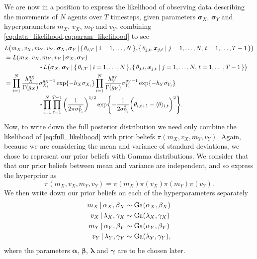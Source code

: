 We are now in a position to express the likelihood of observing data describing the movements of $N$ agents over $T$ timesteps, given parameters $\bm{\sigma}_X$, $\bm{\sigma}_Y$ and hyperparameters $m_X$, $v_X$, $m_Y$ and $v_Y$, combining \cref{eq:data_likelihood,eq:param_likelihood} to see
\begin{align}
\label{eq:full_likelihood}
\begin{split}
& 	L\big(m_X, v_X, m_Y, v_Y, \bm{\sigma}_X, \bm{\sigma}_Y  \given \{\,\theta_{i, T} \mid i=1,\ldots,N\,\},  \{\,\theta_{j, t}, \bm{x}_{j, t} \mid j= 1,\ldots, N, \, t=1,  \ldots,T-1\,\}\big) \\
	& = 	L(m_X, v_X, m_Y, v_Y \given \bm{\sigma}_X, \bm{\sigma}_Y)\\
	& \qquad\qquad\qquad \!\! \bigcdot L\big(\bm{\sigma}_X, \bm{\sigma}_Y  \given \{\,\theta_{i, T} \mid i=1,\ldots,N\,\},  \{\,\theta_{j, t}, \bm{x}_{j, t} \mid j= 1,\ldots, N, \, t=1,  \ldots,T-1\,\}\big)\\
	& = \prod_{i=1}^N \frac{h_X^{g_X}}{\Gamma(g_X)} \sigma_{X_i}^{g_X - 1} \exp{-h_X \sigma_{X_i}} \prod_{i=1}^N  \frac{h_Y^{g_Y}}{\Gamma(g_Y)} \sigma_{Y_i}^{g_Y - 1} \exp{-h_Y \sigma_{Y_i}}\\
	& \qquad\qquad\qquad \!\! \bigcdot \prod_{i=1}^N \prod_{t=1}^{T-1} \bigg( \frac{1}{2\pi\sigma_{Y_i}^2} \bigg)^{1/2} \exp{-\frac{1}{2\sigma_{Y_i}^2} \bigg(\theta_{i, t+1} - \langle \theta \rangle_{i, t}\bigg)^2 }.
\end{split}
\end{align}

Now, to write down the full posterior distribution we need only combine the likelihood of \cref{eq:full_likelihood} with prior beliefs $\pi(m_X, v_X, m_Y, v_Y)$. Again, because we are considering the mean and variance of standard deviations, we chose to represent our prior beliefs with Gamma distributions. We consider that that our prior beliefs between mean and variance are independent, and so express the hyperprior as
\begin{equation*}
	\pi(m_X, v_X, m_Y, v_Y) = \pi(m_X) \pi(v_X) \pi(m_Y) \pi(v_Y).
\end{equation*}
We then write down our prior beliefs on each of the hyperparameters separately
\begin{align*}
	m_X \,|\, \alpha_X, \beta_X & \sim \textrm{Ga}(\alpha_X, \beta_X) \\
	v_X \,|\, \lambda_X, \gamma_X & \sim  \textrm{Ga}(\lambda_X, \gamma_X) \\
	m_Y \,|\, \alpha_Y, \beta_Y & \sim \textrm{Ga}(\alpha_Y, \beta_Y) \\
	v_Y \,|\, \lambda_Y, \gamma_Y & \sim  \textrm{Ga}(\lambda_Y, \gamma_Y),
\end{align*}
where the parameters $\bm{\alpha}$, $\bm{\beta}$, $\bm{\lambda}$ and $\bm{\gamma}$ are to be chosen later.

